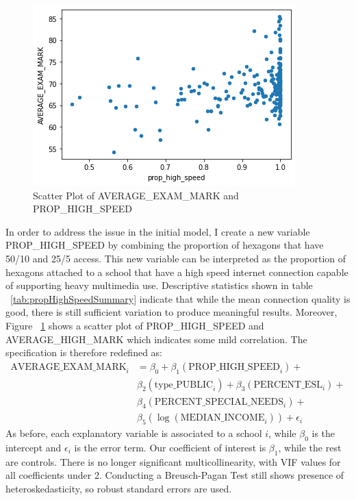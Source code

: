 \documentclass[stu, floatsintext]{apa7}
\begin{document}
\begin{figure}
    \caption{Scatter Plot of AVERAGE\_EXAM\_MARK and PROP\_HIGH\_SPEED}
    \label{fig:scatterPropAverage}
    \includegraphics[scale=0.75]{prop_mark_scatter.png}
\end{figure}
    In order to address the issue in the initial model, I create a new variable PROP\_HIGH\_SPEED by combining the proportion of hexagons that have 50/10 and 25/5 access. This new variable can be interpreted as the proportion of hexagons attached to a school that have a high speed internet connection capable of supporting heavy multimedia use. Descriptive statistics shown in table ~\ref{tab:propHighSpeedSummary} indicate that while the mean connection quality is good, there is still sufficient variation to produce meaningful results. Moreover, Figure ~\ref{fig:scatterPropAverage} shows a scatter plot of PROP\_HIGH\_SPEED and AVERAGE\_HIGH\_MARK which indicates some mild correlation. The specification is therefore redefined as:
    \begin{align*}
        \text{AVERAGE\_EXAM\_MARK}_i &= \beta_0 + \beta_1(\text{PROP\_HIGH\_SPEED}_i) + \\
        & \beta_2(\text{type\_PUBLIC}_i) + \beta_3(\text{PERCENT\_ESL}_i) + \\
        & \beta_4(\text{PERCENT\_SPECIAL\_NEEDS}_i) + \\
        & \beta_5(\log(\text{MEDIAN\_INCOME}_i)) + \epsilon_i
    \end{align*}
    As before, each explanatory variable is associated to a school $i$, while $\beta_0$ is the intercept and $\epsilon_i$ is the error term. Our coefficient of interest is $\beta_1$, while the rest are controls. There is no longer significant multicollinearity, with VIF values for all coefficients under 2. Conducting a Breusch-Pagan Test still shows presence of heteroskedasticity, so robust standard errors are used.
\end{document}

